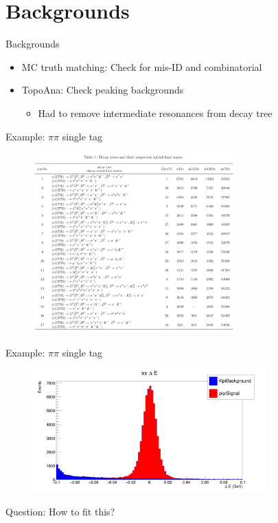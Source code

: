 \documentclass{beamer}
\begin{document}
\section{Backgrounds}
\begin{frame}{Backgrounds}
  \begin{itemize}
    \setlength\itemsep{2em}
    \item{MC truth matching: Check for mis-ID and combinatorial}
    \item{TopoAna: Check peaking backgrounds}
    \begin{itemize}
      \item{Had to remove intermediate resonances from decay tree}
    \end{itemize}
  \end{itemize}
\end{frame}

\begin{frame}{Example: $\pi\pi$ single tag}
  \begin{figure}
    \centering
    \includegraphics[width=0.7\textwidth]{pipiDecayTree.png}
  \end{figure}
\end{frame}

\begin{frame}{Example: $\pi\pi$ single tag}
  \begin{figure}
    \centering
    \includegraphics[width=0.8\textwidth]{pipiDeltaEBackground.png}
  \end{figure}
  Question: How to fit this?
\end{frame}
\end{document}
